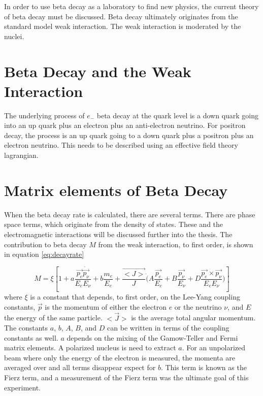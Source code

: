 In order to use beta decay as a laboratory to find new physics, the current theory of beta decay must be discussed.
Beta decay ultimately originates from the standard model weak interaction.
The weak interaction is moderated by the nuclei.

\section{Beta Decay and the Weak Interaction}
The underlying process of $e_{-}$ beta decay at the quark level is a down quark going into an up quark plus an electron plus an anti-electron neutrino.
For positron decay, the process is an up quark going to a down quark plus a positron plus an electron neutrino. 
This needs to be described using an effective field theory lagrangian. 

\section{Matrix elements of Beta Decay}
When the beta decay rate is calculated, there are several terms.
There are phase space terms, which originate from the density of states.
These and the electromagnetic interactions will be discussed further into the thesis. 
The contribution to beta decay $M$ from the weak interaction, to first order, is shown in equation \ref{eq:decayrate} \cite{ref:oscarpaper}

\begin{equation}
	M = \xi [1 + a \frac{\vec{p_{e}} \dot \vec{p_{\nu}}} {E_{e} E_{\nu}}  +  b \frac{m_{e}}{E_{e}} + \frac{\vec{<J>}}{J} \dot (A \frac{ \vec{p_{e}} }{E_{e}} + B \frac{\vec{p_{\nu}}}{E_{\nu}} + D \frac{\vec{p_{e}} \times \vec{p_{\nu}}}{E_{e} E_{\nu}})]
	\label{eq:decayrate}
\end{equation}
where $\xi$ is a constant that depends, to first order, on the Lee-Yang coupling constants, $\vec{p}$  is the momentum of either the electron $e$ or the neutrino $\nu$, and $E$ the energy of the same particle.
$<\vec{J}>$ is the average total angular momentum. 
The constants $a$, $b$, $A$, $B$, and $D$ can be written in terms of the coupling constants as well.
$a$ depends on the mixing of the Gamow-Teller and Fermi matrix elements.
A polarized nucleus is need to extract $a$. 
For an unpolarized beam where only the energy of the electron is measured, the momenta are averaged over and all terms disappear expect for $b$.
This term is known as the Fierz term, and a measurement of the Fierz term was the ultimate goal of this experiment. 

